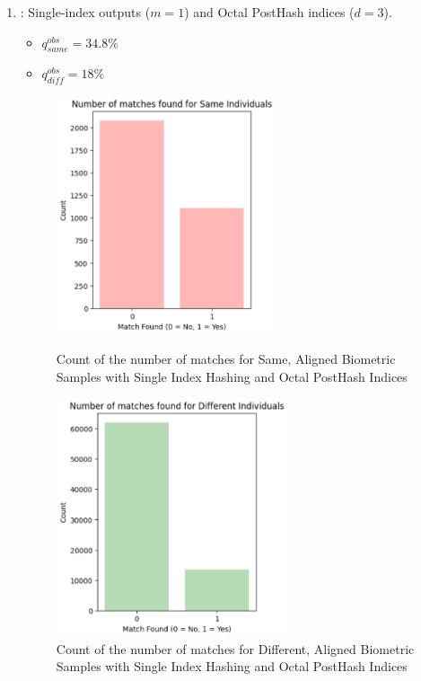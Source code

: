 \begin{enumerate}
    \item {}: Single-index outputs (\(m=1\)) and Octal PostHash indices (\(d=3\)).
    \begin{itemize}
        \item \(q_{same}^{obs} = 34.8\%\)
        \item \(q_{diff}^{obs} = 18\%\)
    \end{itemize}

    \begin{figure}[H]
        \centering
        \begin{minipage}[b]{0.48\linewidth}
            \centering
            \includegraphics[width=\linewidth,height=7cm,keepaspectratio]{latex-img/d3same.png}
            \caption{Count of the number of matches for Same, Aligned Biometric Samples with Single Index Hashing and Octal PostHash Indices}
            \label{mu_same}
        \end{minipage}
        \hfill
        \begin{minipage}[b]{0.48\linewidth}
            \centering
            \includegraphics[width=\linewidth,height=7cm,keepaspectratio]{latex-img/d3diff.png}
            \caption{Count of the number of matches for Different, Aligned Biometric Samples with Single Index Hashing and Octal PostHash Indices}
            \label{mu_diff}
        \end{minipage}
    \end{figure}
    

\end{enumerate}
